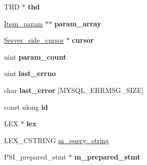 \begin{DoxyCompactItemize}
\item 
\mbox{\label{classPrepared__statement_aae476bbde53477868c74819970654cf9}} 
T\+HD $\ast$ {\bfseries thd}
\item 
\mbox{\label{classPrepared__statement_a43cc99910f947a1edb2041b6ba7978c2}} 
\mbox{\hyperlink{classItem__param}{Item\+\_\+param}} $\ast$$\ast$ {\bfseries param\+\_\+array}
\item 
\mbox{\label{classPrepared__statement_a6e1d8b78bc4e4c90342dc0601351f347}} 
\mbox{\hyperlink{classServer__side__cursor}{Server\+\_\+side\+\_\+cursor}} $\ast$ {\bfseries cursor}
\item 
\mbox{\label{classPrepared__statement_ac6db9999376b18bd54a1f3fc4d45de52}} 
uint {\bfseries param\+\_\+count}
\item 
\mbox{\label{classPrepared__statement_a540582dd0ac036af68fdffa6864588fa}} 
uint {\bfseries last\+\_\+errno}
\item 
\mbox{\label{classPrepared__statement_ab9f86940e85aa16a85160804e028caf0}} 
char {\bfseries last\+\_\+error} \mbox{[}M\+Y\+S\+Q\+L\+\_\+\+E\+R\+R\+M\+S\+G\+\_\+\+S\+I\+ZE\mbox{]}
\item 
\mbox{\label{classPrepared__statement_a85a2579e7ff4d9d0cbbdd2990ee72149}} 
const ulong {\bfseries id}
\item 
\mbox{\label{classPrepared__statement_abc0f85d1830c97dbfb54370827427f23}} 
L\+EX $\ast$ {\bfseries lex}
\item 
L\+E\+X\+\_\+\+C\+S\+T\+R\+I\+NG \mbox{\hyperlink{classPrepared__statement_a1dd19fad322528df92ab374a076e3bf8}{m\+\_\+query\+\_\+string}}
\item 
\mbox{\label{classPrepared__statement_afa80e420bb61337206170eb4571f015f}} 
P\+S\+I\+\_\+prepared\+\_\+stmt $\ast$ {\bfseries m\+\_\+prepared\+\_\+stmt}
\end{DoxyCompactItemize}


